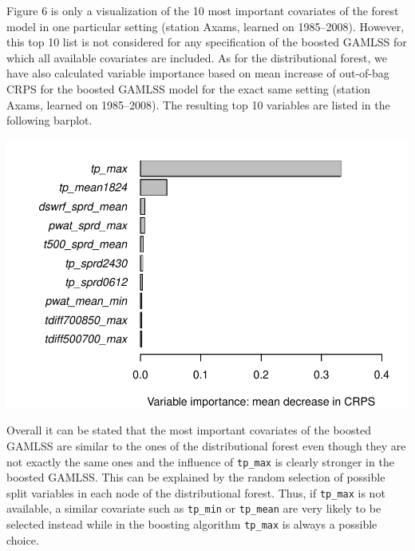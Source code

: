 \documentclass[american,foldmarks=false,noconfig]{uibklttr}
\begin{document}
Figure 6 is only a visualization of the 10 most important covariates 
of the forest model in one particular setting (station Axams, learned 
on 1985--2008). However, this top 10 list is not considered for any specification 
of the boosted GAMLSS for which all available covariates are included. As 
for the distributional forest, we have also calculated variable importance 
based on mean increase of out-of-bag CRPS for the boosted GAMLSS model for 
the exact same setting (station Axams, learned on 1985--2008). The resulting 
top 10 variables are listed in the following barplot.

\begin{center}
\includegraphics[width = .7\textwidth]{varimp_gb.pdf}
\end{center}

Overall it can be stated that the most important covariates of the boosted 
GAMLSS are similar to the ones of the distributional forest even though they
are not exactly the same ones and the influence of \texttt{tp\_max} is clearly
stronger in the boosted GAMLSS. This can be explained by the random selection
of possible split variables in each node of the distributional forest. Thus,
if \texttt{tp\_max} is not available, a similar covariate such as \texttt{tp\_min}
or \texttt{tp\_mean} are very likely to be selected instead while in the boosting
algorithm \texttt{tp\_max} is always a possible choice.


\end{document}
